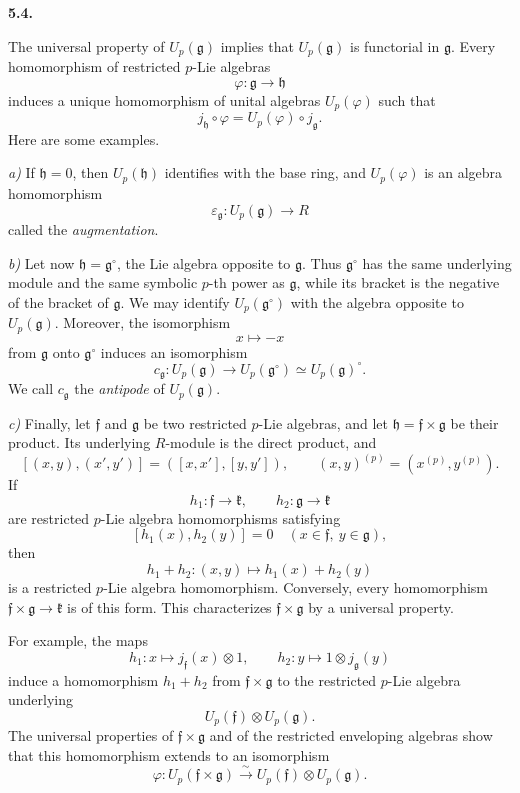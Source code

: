 
\medskip
\noindent\textbf{5.4.}
\label{sga3:VIIA:5.4}

The universal property of \(U_p(\mathfrak g)\) implies that
\(U_p(\mathfrak g)\) is functorial in \(\mathfrak g\). Every
homomorphism of restricted \(p\)-Lie algebras
\[
  \varphi:\mathfrak g\longrightarrow\mathfrak h
\]
induces a unique homomorphism of unital algebras \(U_p(\varphi)\)
such that
\[
  j_{\mathfrak h}\circ\varphi
  =
  U_p(\varphi)\circ j_{\mathfrak g}.
\]
Here are some examples.

\smallskip
\noindent\textit{a)}
If \(\mathfrak h=0\), then \(U_p(\mathfrak h)\) identifies with the
base ring, and \(U_p(\varphi)\) is an algebra homomorphism
\[
  \varepsilon_{\mathfrak g}:
  U_p(\mathfrak g)\longrightarrow R
\]
called the \emph{augmentation}.

\smallskip
\noindent\textit{b)}
Let now \(\mathfrak h=\mathfrak g^\circ\), the Lie algebra opposite
to \(\mathfrak g\). Thus \(\mathfrak g^\circ\) has the same
underlying module and the same symbolic \(p\)-th power as
\(\mathfrak g\), while its bracket is the negative of the bracket
of \(\mathfrak g\). We may identify
\(U_p(\mathfrak g^\circ)\) with the algebra opposite to
\(U_p(\mathfrak g)\). Moreover, the isomorphism
\[
  x\longmapsto-x
\]
from \(\mathfrak g\) onto \(\mathfrak g^\circ\) induces an
isomorphism
\[
  c_{\mathfrak g}:
  U_p(\mathfrak g)
  \longrightarrow
  U_p(\mathfrak g^\circ)
  \simeq
  U_p(\mathfrak g)^\circ.
\]
We call \(c_{\mathfrak g}\) the \emph{antipode} of
\(U_p(\mathfrak g)\).

\smallskip
\noindent\textit{c)}
Finally, let \(\mathfrak f\) and \(\mathfrak g\) be two restricted
\(p\)-Lie algebras, and let
\(\mathfrak h=\mathfrak f\times\mathfrak g\) be their product.
Its underlying \(R\)-module is the direct product, and
\[
  [(x,y),(x',y')]
  =
  ([x,x'],[y,y']),
  \qquad
  (x,y)^{(p)}
  =
  (x^{(p)},y^{(p)}).
\]
If
\[
  h_1:\mathfrak f\to\mathfrak k,
  \qquad
  h_2:\mathfrak g\to\mathfrak k
\]
are restricted \(p\)-Lie algebra homomorphisms satisfying
\[
  [h_1(x),h_2(y)]=0
  \quad
  (x\in\mathfrak f,\ y\in\mathfrak g),
\]
then
\[
  h_1+h_2:(x,y)\longmapsto h_1(x)+h_2(y)
\]
is a restricted \(p\)-Lie algebra homomorphism. Conversely, every
homomorphism \(\mathfrak f\times\mathfrak g\to\mathfrak k\) is of
this form. This characterizes \(\mathfrak f\times\mathfrak g\) by
a universal property.

For example, the maps
\[
  h_1:x\longmapsto j_{\mathfrak f}(x)\otimes1,
  \qquad
  h_2:y\longmapsto1\otimes j_{\mathfrak g}(y)
\]
induce a homomorphism \(h_1+h_2\) from
\(\mathfrak f\times\mathfrak g\) to the restricted \(p\)-Lie
algebra underlying
\[
  U_p(\mathfrak f)\otimes U_p(\mathfrak g).
\]
The universal properties of \(\mathfrak f\times\mathfrak g\) and
of the restricted enveloping algebras show that this homomorphism
extends to an isomorphism
\[
  \varphi:
  U_p(\mathfrak f\times\mathfrak g)
  \xrightarrow{\sim}
  U_p(\mathfrak f)\otimes U_p(\mathfrak g).
\]

